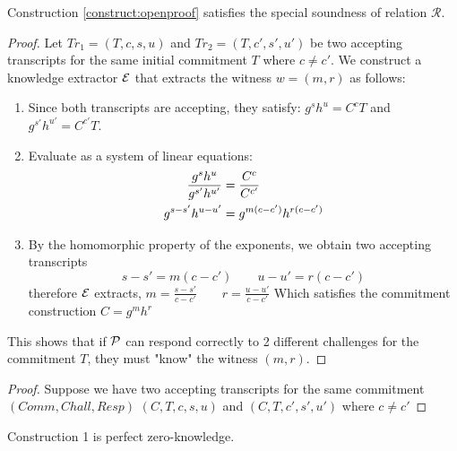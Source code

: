 \begin{theorem}
    Construction \ref{construct:openproof} satisfies the special soundness of relation $\mathcal{R}$. 
\end{theorem}
\begin{proof}
    Let $Tr_1 = (T, c, s, u)$ and $Tr_2 = (T,c',s',u')$ be two accepting transcripts for the same initial commitment $T$ where $c \neq c'$. We construct a knowledge extractor $\mathcal{E}$ that extracts the witness $w = (m,r)$ as follows:
    \begin{enumerate}
        \item  Since both transcripts are accepting, they satisfy: $g^sh^u = C^cT$ and $g^{s'}h^{u'} = C^{c'}T$.
        \item Evaluate as a system of linear equations:
             \begin{align}
               \frac{g^sh^u}{g^{s'}h^{u'}} &= \frac{C^c}{C^{c'}} \notag \\
               g^{s-s'}h^{u-u'} &= g^{m(c-c')}h^{r(c-c')} \notag \\
            \end{align}
       \item By the homomorphic property of the exponents, we obtain two accepting transcripts 
       \[
       s-s' = m(c-c') \qquad u-u' = r(c-c')
       \] 
       therefore $\mathcal{E}$ extracts, $m = \frac{s-s'}{c-c'} \qquad r = \frac{u-u'}{c-c'}$ Which satisfies the commitment construction $C = g^mh^r$
    \end{enumerate}

    This shows that if $\mathcal{P}$ can respond correctly to 2 different challenges for the commitment $T$, they must "know" the witness $(m,r)$.
\end{proof}

\begin{proof}
    Suppose we have two accepting transcripts for the same commitment $(Comm, Chall, Resp)$
    $(C, T, c, s, u)$ and $(C,T,c',s',u')$ where $c \neq c'$
\end{proof}


\begin{theorem}
    Construction 1 is perfect zero-knowledge.
\end{theorem}

